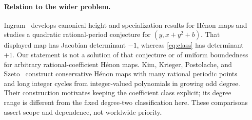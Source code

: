 \paragraph{Relation to the wider problem.}
Ingram~\cite{ingram2014canonical} develops canonical-height and
specialization results for H\'enon maps and studies a quadratic
rational-period conjecture for $(y,x+y^2+b)$. That displayed map has
Jacobian determinant $-1$, whereas \eqref{eq:class} has determinant
$+1$. Our statement is not a solution of that conjecture or of
uniform boundedness for arbitrary rational-coefficient H\'enon maps.
Kim, Krieger, Postolache, and Szeto~\cite[Theorems A--B]{kim2025many}
construct conservative H\'enon maps with many rational periodic
points and long integer cycles from integer-valued polynomials in
growing odd degree. Their construction motivates keeping the
coefficient class explicit; its degree range is different from the
fixed degree-two classification here. These comparisons assert
scope and dependence, not worldwide priority.
